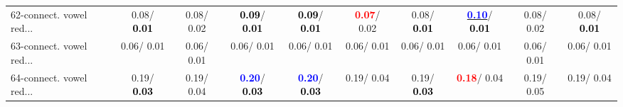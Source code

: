 \begin{table}[h]
\begin{center}
{\begin{tabular}{lc|c|c|c|c|c|c|c|c}
62-connect. vowel red... &   0.08/\textcolor{black}{\textbf{  0.01}} &   0.08/  0.02 & \textcolor{black}{\textbf{  0.09}}/\textcolor{black}{\textbf{  0.01}} & \textcolor{black}{\textbf{  0.09}}/\textcolor{black}{\textbf{  0.01}} & \textcolor{red}{\textbf{  0.07}}/  0.02 &   0.08/\textcolor{black}{\textbf{  0.01}} & \underline{\textcolor{blue}{\textbf{  0.10}}}/\textcolor{black}{\textbf{  0.01}} &   0.08/  0.02 &   0.08/\textcolor{black}{\textbf{  0.01}} \\
63-connect. vowel red... &   0.06/  0.01 &   0.06/  0.01 &   0.06/  0.01 &   0.06/  0.01 &   0.06/  0.01 &   0.06/  0.01 &   0.06/  0.01 &   0.06/  0.01 &   0.06/  0.01 \\
64-connect. vowel red... &   0.19/\textcolor{black}{\textbf{  0.03}} &   0.19/  0.04 & \textcolor{blue}{\textbf{  0.20}}/\textcolor{black}{\textbf{  0.03}} & \textcolor{blue}{\textbf{  0.20}}/\textcolor{black}{\textbf{  0.03}} &   0.19/  0.04 &   0.19/\textcolor{black}{\textbf{  0.03}} & \textcolor{red}{\textbf{  0.18}}/  0.04 &   0.19/  0.05 &   0.19/  0.04 \\\end{tabular}}\label{stratsALCKappa1AllRedux50a}
\end{center}
\end{table}
